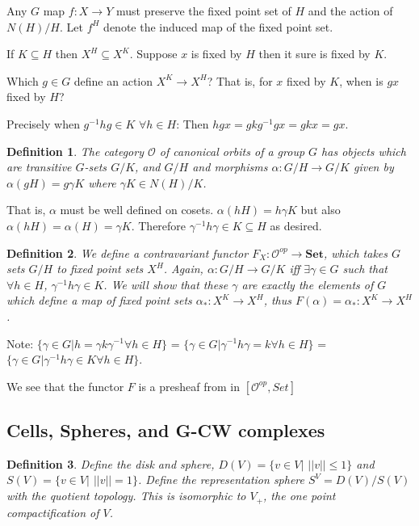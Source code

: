\documentclass{article}
\theoremstyle{problemstyle}
\theoremstyle{problemstyle}
\newtheorem{definition}{Definition}
\theoremstyle{problemstyle}
\theoremstyle{problemstyle}
\theoremstyle{problemstyle}
\theoremstyle{problemstyle}
\begin{document}
Any $G$ map $f:X \rightarrow Y$ must preserve the fixed point set of $H$ and the action of $N(H)/H$. Let $f^H$ denote the induced map of the fixed point set. 

If $K \subseteq H$ then $X^H \subseteq X^K$. Suppose $x$ is fixed by $H$ then it sure is fixed by $K$. 

Which $g\in G$ define an action $X^K \rightarrow X^H$? That is, for $x$ fixed by $K$, when is $gx$ fixed by $H$?

Precisely when $g^{-1}hg \in K$ $\forall h \in H$: Then $hgx = gkg^{-1}gx = gkx = gx$. 

\begin{definition}
The category $\mathscr{O}$ of canonical orbits of a group $G$ has objects which are transitive $G$-sets $G/K$, and $G/H$ and morphisms $\alpha:G/H \rightarrow G/K$ given by $\alpha(gH) = g\gamma K$ where $\gamma K \in N(H)/K$. 
\end{definition}

That is, $\alpha$ must be well defined on cosets. $\alpha(hH) = h\gamma K$ but also $\alpha(hH) = \alpha(H) = \gamma K$. Therefore $\gamma^{-1}h\gamma \in K \subseteq H$ as desired. 

\begin{definition}
We define a contravariant functor $F_X:\mathscr{O}^{op}\rightarrow \textbf{Set}$, which takes $G$ sets $G/H$ to fixed point sets $X^H$. Again, $\alpha:G/H \rightarrow G/K$ iff $\exists \gamma\in G$ such that $\forall h \in H$, $\gamma^{-1}h\gamma \in K$. We will show that these $\gamma$ are exactly the elements of $G$ which define a map of fixed point sets $\alpha_{*}:X^K\rightarrow X^H$, thus $F(\alpha) = \alpha_{*}:X^K\rightarrow X^H$. 
\end{definition}

Note: $\{\gamma \in G| h = \gamma k\gamma^{-1} \forall h \in H \}$ = $\{\gamma \in G| \gamma^{-1}h\gamma = k \forall h \in H \}$ = 
$\{\gamma \in G| \gamma^{-1}h\gamma \in K \forall h \in H \}$. 

We see that the functor $F$ is a presheaf from in $[\mathscr{O}^{op},Set]$

\subsection{Cells, Spheres, and G-CW complexes}

\begin{definition}
Define the disk and sphere, $D(V) = \{v \in V|$ $||v|| \leq 1\}$ and $S(V) = \{v \in V|$ $||v|| = 1\}$. Define the representation sphere $S^V = D(V)/S(V)$ with the quotient topology. This is isomorphic to $V_{+}$, the one point compactification of $V$. 
\end{definition}
\end{document}
